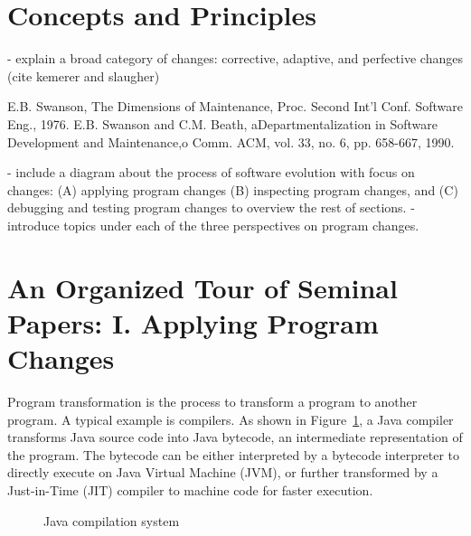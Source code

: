 \documentclass[runningheads,a4paper]{llncs}
\begin{document}
\section{Concepts and Principles}

- explain a broad category of changes: corrective, adaptive, and perfective changes (cite kemerer and slaugher)  

E.B. Swanson, The Dimensions of Maintenance, Proc. Second Int'l Conf. Software Eng., 1976.
E.B. Swanson and C.M. Beath, aDepartmentalization in Software Development and Maintenance,o Comm. ACM, vol. 33, no. 6, pp. 658-667, 1990.

- include a diagram about the process of software evolution with focus on changes: (A) applying program changes (B) inspecting program changes, and (C) debugging and testing program changes to overview the rest of sections.  
- introduce topics under each of the three perspectives on program changes. 

\section{An Organized Tour of Seminal Papers: I. Applying Program Changes}

Program transformation is the process to transform a program to another program. A typical example is compilers. As shown in Figure~\ref{fig:javacompilation}, a Java compiler transforms Java source code into Java bytecode, an intermediate representation of the program. The bytecode can be either interpreted by a bytecode interpreter to directly execute on Java Virtual Machine (JVM), or further transformed by a Just-in-Time (JIT) compiler to machine code for faster execution.

\begin{figure}
\centering
{}
\caption{Java compilation system}
\label{fig:javacompilation}
\end{figure}
\end{document}
